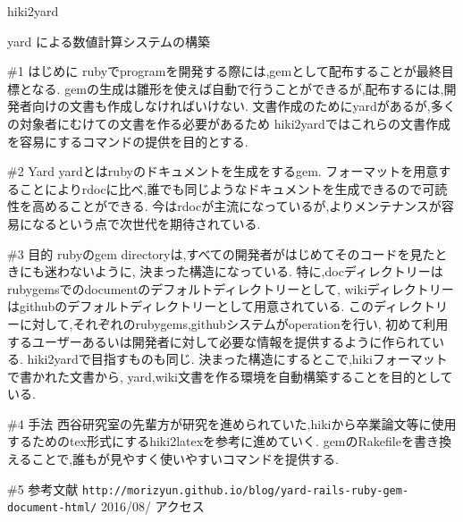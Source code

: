 \documentclass[12pt,a4paper]{jsarticle}
\begin{document}
hiki2yard

yard による数値計算システムの構築

\#1 はじめに
rubyでprogramを開発する際には,gemとして配布することが最終目標となる.
gemの生成は雛形を使えば自動で行うことができるが,配布するには,開発者向けの文書も作成しなければいけない.
文書作成のためにyardがあるが,多くの対象者にむけての文書を作る必要があるため
hiki2yardではこれらの文書作成を容易にするコマンドの提供を目的とする.

\#2 Yard
yardとはrubyのドキュメントを生成をするgem.
フォーマットを用意することによりrdocに比べ,誰でも同じようなドキュメントを生成できるので可読性を高めることができる.
今はrdocが主流になっているが,よりメンテナンスが容易になるという点で次世代を期待されている.

\#3 目的
rubyのgem directoryは,すべての開発者がはじめてそのコードを見たときにも迷わないように,
決まった構造になっている.
特に,docディレクトリーはrubygemsでのdocumentのデフォルトディレクトリーとして,
wikiディレクトリーはgithubのデフォルトディレクトリーとして用意されている.
このディレクトリーに対して,それぞれのrubygems,githubシステムがoperationを行い,
初めて利用するユーザーあるいは開発者に対して必要な情報を提供するように作られている.
hiki2yardで目指すものも同じ.
決まった構造にするとこで,hikiフォーマットで書かれた文書から,
yard,wiki文書を作る環境を自動構築することを目的としている.

\#4 手法
西谷研究室の先輩方が研究を進められていた,hikiから卒業論文等に使用するためのtex形式にするhiki2latexを参考に進めていく.
gemのRakefileを書き換えることで,誰もが見やすく使いやすいコマンドを提供する.

\#5 参考文献
\verb|http://morizyun.github.io/blog/yard-rails-ruby-gem-document-html/|
2016/08/  アクセス
\end{document}
